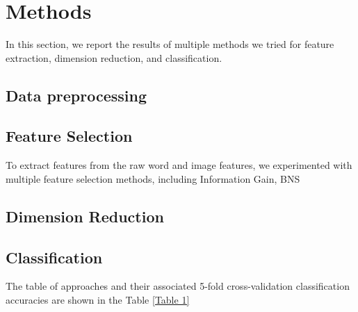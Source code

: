 \section{Methods}
In this section, we report the results of multiple methods we tried for feature extraction, dimension reduction, and classification. 

\subsection{Data preprocessing}

\subsection{Feature Selection}
To extract features from the raw word and image features, we experimented with multiple feature selection methods, including Information Gain, BNS
\subsection{Dimension Reduction}
\subsection{Classification}




The table of approaches and their associated 5-fold cross-validation classification accuracies are shown in the Table \ref{Table 1}

